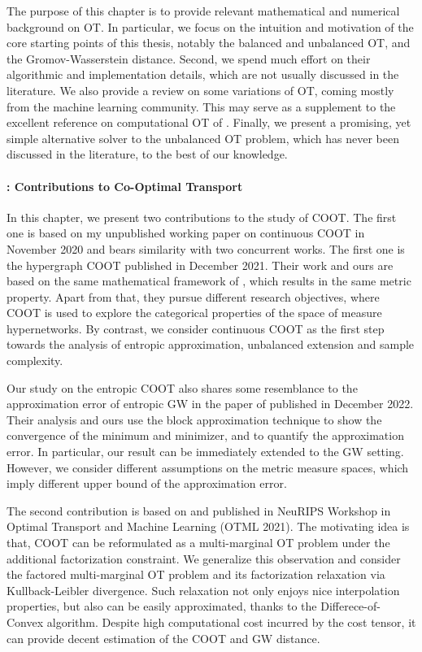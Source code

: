 The purpose of this chapter is to provide relevant mathematical and numerical background
on OT. In particular, we focus on the intuition and motivation of the core starting points
of this thesis, notably the balanced and unbalanced OT, and the Gromov-Wasserstein distance.
Second, we spend much effort on their algorithmic and implementation details, which are not
usually discussed in the literature. We also provide a review on some variations of OT,
coming mostly from the machine learning community. This may serve as a supplement
to the excellent reference on computational OT of \citep{Peyre19}.
Finally, we present a promising, yet simple alternative solver to the unbalanced OT problem,
which has never been discussed in the literature, to the best of our knowledge.

\paragraph{: Contributions to Co-Optimal Transport}

In this chapter, we present two contributions to the study of COOT.
The first one is based on my unpublished working paper
on continuous COOT in November 2020 and bears similarity with two concurrent works.
The first one is the hypergraph COOT \citep{Chowdhury21b} published in December 2021.
Their work and ours are based on the same mathematical framework of \citep{Chowdhury19},
which results in the same metric property. Apart from that, they pursue different research objectives,
where COOT is used to explore the categorical properties of the space of measure hypernetworks.
By contrast, we consider continuous COOT as the first step towards the analysis of
entropic approximation, unbalanced extension and sample complexity.

Our study on the entropic COOT also shares some resemblance to the approximation error of
entropic GW in the paper of \citep{Zhang23} published in December 2022.
Their analysis and ours use the block approximation technique \citep{Carlier17}
to show the convergence of the minimum and minimizer, and to quantify the approximation error.
In particular, our result can be immediately extended to the GW setting. However,
we consider different assumptions on the metric measure spaces,
which imply different upper bound of the approximation error.

The second contribution is based on \citep{Tran21} and published in NeuRIPS Workshop in Optimal
Transport and Machine Learning (OTML 2021). The motivating idea is that,
COOT can be reformulated as a multi-marginal OT problem under the additional factorization constraint.
We generalize this observation and consider the factored multi-marginal OT problem
and its factorization relaxation via Kullback-Leibler divergence.
Such relaxation not only enjoys nice interpolation properties, but also
can be easily approximated, thanks to the Differece-of-Convex algorithm.
Despite high computational cost incurred by the cost tensor,
it can provide decent estimation of the COOT and GW distance.

